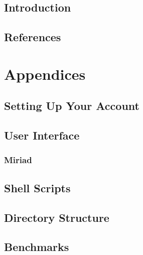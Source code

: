 \documentclass[headsepline,normalheadings]{book}
\begin{document}
\chapter                {Introduction}
 
\cleardoublepage
\chapter                {References}
 
\appendix
\cleardoublepage
\part{Appendices}
\chapter                {Setting Up Your Account}
 
\cleardoublepage
\chapter                {User Interface}
 
\section		{Miriad}
 
% 
\cleardoublepage
\chapter                {Shell Scripts}
 
\cleardoublepage
\chapter                {Directory Structure}
 
\cleardoublepage
\chapter                {Benchmarks}
 
\cleardoublepage
\end{document}
